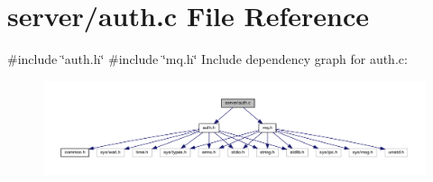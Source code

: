 \section{server/auth.c File Reference}
\label{auth_8c}
{\ttfamily \#include \char`\"{}auth.\+h\char`\"{}}\newline
{\ttfamily \#include \char`\"{}mq.\+h\char`\"{}}\newline
Include dependency graph for auth.\+c\+:\nopagebreak
\begin{figure}[H]
\begin{center}
\leavevmode
\includegraphics[width=350pt]{auth_8c__incl}
\end{center}
\end{figure}
